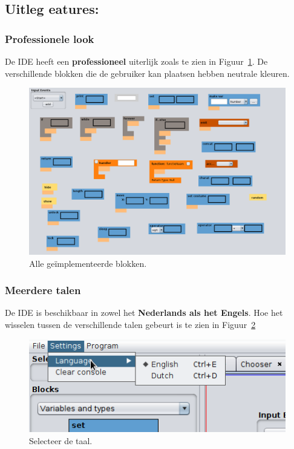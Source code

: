 \documentclass[]{article}
\begin{document}
\subsection{Uitleg eatures: }
\subsubsection{Professionele look}
De IDE heeft een \textbf{professioneel} uiterlijk zoals te zien in Figuur~\ref{prof}. De verschillende blokken die de gebruiker kan plaatsen hebben neutrale kleuren. 
\begin{figure}[H]
\centering
\includegraphics[width=1.1\textwidth]{./Functionaliteit/blocks.png}
\caption{Alle ge\"implementeerde blokken.}
\label{prof}
\end{figure}

\subsubsection{Meerdere talen}
De IDE is beschikbaar in zowel het \textbf{Nederlands als het Engels}. Hoe het wisselen tussen de verschillende talen gebeurt is te zien in Figuur~\ref{lang}
\begin{figure}[H]
\centering
\includegraphics[width=1.1\textwidth]{./Functionaliteit/lang.png}
\caption{Selecteer de taal.}
\label{lang}
\end{figure}
\end{document}
